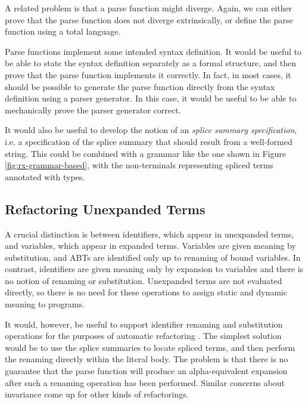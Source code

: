 A related problem is that a parse function might diverge. Again, we can either prove that the parse function does not diverge extrinsically, or define the parse function using a total language.

Parse functions implement some intended syntax definition. It would be useful to be able to state the syntax definition separately as a formal structure, and then prove that the parse function implements it correctly. In fact, in most cases, it should be possible to generate the parse function directly from the syntax definition using a parser generator. In this case, it would be useful to be able to mechanically prove the parser generator correct.

It would also be useful to develop the notion of an \emph{splice summary specification}, i.e. a specification of the splice summary that should result from a well-formed string. This could be combined with a grammar like the one shown in Figure \ref{fig:rx-grammar-based}, with the non-terminals representing spliced terms annotated with types.

\subsection{Refactoring Unexpanded Terms}\label{sec:refactoring}
A crucial distinction is between identifiers, which appear in unexpanded terms, and variables, which appear in expanded terms. Variables are given meaning by substitution, and ABTs are identified only up to renaming of bound variables. In contrast, identifiers are given meaning only by expansion to variables and there is no notion of renaming or substitution. Unexpanded terms are not evaluated directly, so there is no need for these operations to assign static and dynamic meaning to programs.

It would, however, be useful to support identifier renaming and substitution operations for the purposes of automatic refactoring \cite{mens2004survey}. The simplest solution would be to use the splice summaries to locate spliced terms, and then perform the renaming directly within the literal body. The problem is that there is no guarantee that the parse function will produce an alpha-equivalent expansion after such a renaming operation has been performed. Similar concerns about invariance come up for other kinds of refactorings.

